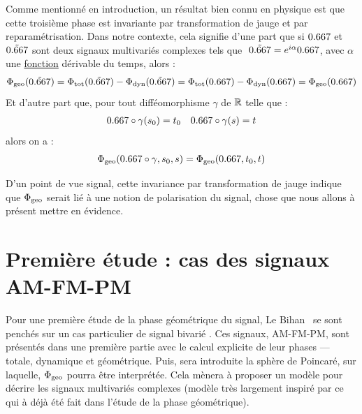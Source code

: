 Comme mentionné en introduction, un résultat bien connu en physique \cite{bohm_geometric_2003,mukunda_quantum_1993,chruscinski_geometric_2004} est que cette troisième phase est invariante par transformation de jauge et par reparamétrisation.
Dans notre contexte, cela signifie d'une part que si $\x$ et $\Tilde{\x}$ sont deux signaux multivariés complexes tels que $\ \Tilde{\x} = e^{i\alpha}\x$, avec $\alpha$ une \underline{fonction} dérivable du temps, alors :
\begin{align*}
	\phaseg(\Tilde{\x}) &= \phaset(\Tilde{\x}) - \phased(\Tilde{\x})  = \phaset(\x) - \phased(\x) = \phaseg(\x)\\
\end{align*}
Et d'autre part que, pour tout difféomorphisme $\gamma$ de $\mathbb{R}$ telle que :
\begin{align*}
	\x\circ\gamma(s_0)&=t_0  &  \x \circ\gamma(s) = t
\end{align*}
alors on a :
\[\phaseg(\x \circ \gamma, s_0, s) = \phaseg(\x, t_0, t)\]
\skipl


D'un point de vue signal, cette invariance par transformation de jauge indique que $\Phi_{\text{\normalfont geo}}$ serait lié à une notion de polarisation du signal, chose que nous allons à présent mettre en évidence.
\\



\section{Première étude : cas des signaux AM-FM-PM} \label{sec:AM-FM-PM}

Pour une première étude de la phase géométrique du signal, Le Bihan \etal~se sont penchés sur un cas particulier de signal bivarié \cite{flamant_timefrequency_2019,le_bihan_modephysiques_2023, le_bihan_geometric_2024}. Ces signaux, AM-FM-PM, sont présentés dans une première partie avec le calcul explicite de leur phases --- totale, dynamique et géométrique. Puis, sera introduite la sphère de Poincaré, sur laquelle, $\Phi_{\text{\normalfont geo}}$ pourra être interprétée.
Cela mènera à proposer un modèle pour décrire les signaux multivariés complexes (modèle très largement inspiré par ce qui à déjà été fait dans l'étude de la phase géométrique).
\\



